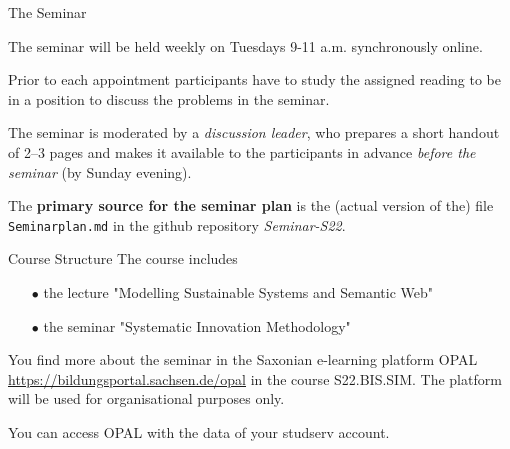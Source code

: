 \documentclass{beamer}
\begin{document}
\begin{frame}{The Seminar}

The seminar will be held weekly on Tuesdays 9-11 a.m. synchronously online.

Prior to each appointment participants have to study the assigned reading to
be in a position to discuss the problems in the seminar.

The seminar is moderated by a \emph{discussion leader}, who prepares a short
handout of 2--3 pages and makes it available to the participants in advance
\emph{before the seminar} (by Sunday evening).

The \textbf{primary source for the seminar plan} is the (actual version of
the) file \texttt{Seminarplan.md} in the github repository \emph{Seminar-S22}.
\end{frame}

\begin{frame}{Course Structure}
The course includes
\begin{itemize}
\item[$\bullet$] the lecture "Modelling Sustainable Systems and Semantic Web"
\item[$\bullet$] the seminar "Systematic Innovation Methodology"
\end{itemize}

You find more about the seminar in the Saxonian e-learning platform OPAL
\url{https://bildungsportal.sachsen.de/opal} in the course S22.BIS.SIM.  The
platform will be used for organisational purposes only.

You can access OPAL with the data of your studserv account.
\end{frame}

\end{document}
